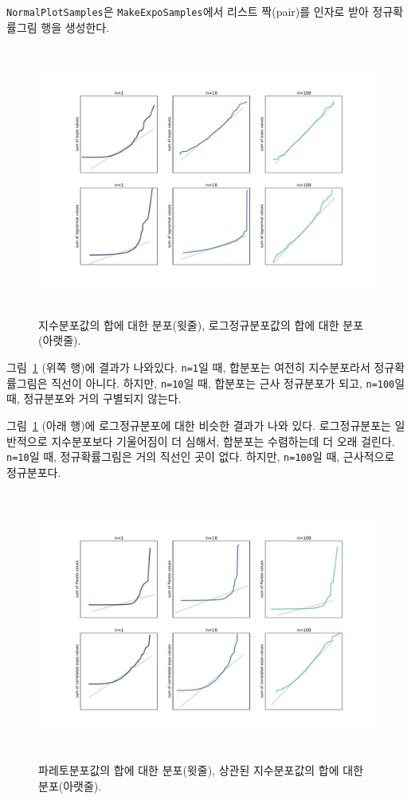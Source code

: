 {\tt NormalPlotSamples}은 {\tt MakeExpoSamples}에서 리스트 짝(pair)를 인자로 받아 정규확률그림 행을 생성한다.

\begin{figure}
\centerline{\includegraphics[height=3.5in]{figs/normal1.pdf}}
\caption{지수분포값의 합에 대한 분포(윗줄), 로그정규분포값의 합에 대한 분포(아랫줄).}
\label{normal1}
\end{figure}

그림~\ref{normal1} (위쪽 행)에 결과가 나와있다.
{\tt n=1}일 때, 합분포는 여전히 지수분포라서 정규확률그림은 직선이 아니다.
하지만, {\tt n=10}일 때, 합분포는 근사 정규분포가 되고,
{\tt n=100}일 때, 정규분포와 거의 구별되지 않는다.

그림~\ref{normal1} (아래 행)에 로그정규분포에 대한 비슷한 결과가 나와 있다.
로그정규분포는 일반적으로 지수분포보다 기울어짐이 더 심해서, 합분포는 수렴하는데 더 오래 걸린다. {\tt n=10}일 때, 정규확률그림은 거의 직선인 곳이 없다. 하지만, {\tt n=100}일 때, 근사적으로 정규분포다.

\begin{figure}
\centerline{\includegraphics[height=3.5in]{figs/normal2.pdf}}
\caption{
파레토분포값의 합에 대한 분포(윗줄), 상관된 지수분포값의 합에 대한 분포(아랫줄).}
\label{normal2}
\end{figure}

